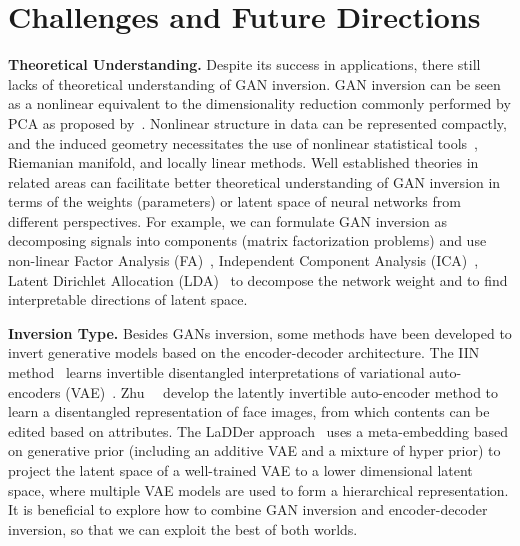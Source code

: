 \section{Challenges and Future Directions}
\label{sec:outlook}

\noindent\textbf{Theoretical Understanding.} 
Despite its success in applications, there still lacks of theoretical understanding of GAN inversion.
GAN inversion can be seen as a nonlinear equivalent to the dimensionality reduction commonly performed by PCA as proposed by~\cite{eric2020GANSpace}. 
Nonlinear structure in data can be represented compactly, and the induced geometry necessitates the use of nonlinear statistical tools~\cite{kuhnel2018latent}, Riemanian manifold, and locally linear methods. 
Well established theories in related areas can facilitate better theoretical understanding of GAN inversion in terms of the weights (parameters) or latent space of neural networks from different perspectives.
For example, we can formulate GAN inversion as decomposing signals into components (matrix factorization problems) and use non-linear Factor Analysis (FA)~\cite{harman1976modern}, Independent Component Analysis (ICA)~\cite{davies2007source}, Latent Dirichlet Allocation (LDA)~\cite{hoffman2010online,blei2003latent} to decompose the network weight and to find interpretable directions of latent space. 

\vspace{1mm}
\noindent\textbf{Inversion Type.} 
Besides GANs inversion, some methods have been developed to invert generative models based on the encoder-decoder architecture.
The IIN method~\cite{esser2020invertible} learns invertible disentangled interpretations of variational auto-encoders (VAE)~\cite{kingma2013auto}. 
Zhu~\etal~\cite{zhu2019lia} develop the latently invertible auto-encoder method to learn a disentangled representation of face images, from which contents can be edited based on attributes. 
The LaDDer approach~\cite{Lin2020LaDDer} uses a meta-embedding based on generative prior (including an additive VAE and a mixture of hyper prior) to project the latent space of a well-trained VAE to a lower dimensional latent space, where multiple VAE models are used to form a hierarchical representation.
It is beneficial to explore how to combine GAN inversion and encoder-decoder inversion, so that we can exploit the best of both worlds.

